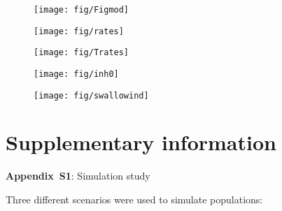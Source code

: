 \documentclass[12pt]{article}
\begin{document}
\clearpage
\begin{figure}
\begin{center}
\texttt{[image: fig/Figmod]}
\caption{ \label{mod}}
\end{center}
\end{figure}


\clearpage
\begin{figure}
\begin{center}
\texttt{[image: fig/rates]}
\caption{ \label{rate}}
\end{center}
\end{figure}


\clearpage
\begin{figure}
\begin{center}
\texttt{[image: fig/Trates]}
\caption{ \label{trates}}
\end{center}
\end{figure}



\clearpage
\begin{figure}
\begin{center}
\texttt{[image: fig/inh0]}
\caption{ \label{inh}}
\end{center}
\end{figure}


\clearpage
\begin{figure}
\begin{center}
\texttt{[image: fig/swallowind]}
\caption{ \label{swallowind}}
\end{center}
\end{figure}


\newpage
\clearpage
\section*{Supplementary information}


\noindent \textbf{Appendix~S1}: Simulation study

Three different scenarios were used to simulate populations:
\end{document}
